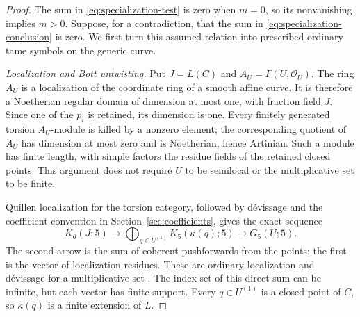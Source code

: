 \begin{proof}
The sum in \eqref{eq:specialization-test} is zero when $m=0$, so its
nonvanishing implies $m>0$.  Suppose, for a contradiction, that the sum in
\eqref{eq:specialization-conclusion} is zero.  We first turn this assumed
relation into prescribed ordinary tame symbols on the generic curve.

\smallskip\noindent\emph{Localization and Bott untwisting.}
Put $J=L(C)$ and $A_U=\Gamma(U,\mathcal O_U)$.  The ring $A_U$ is a
localization of the coordinate ring of a smooth affine curve.  It is
therefore a Noetherian regular domain of dimension at most one, with
fraction field $J$.  Since one of the $p_i$ is retained, its dimension is
one.  Every finitely generated torsion $A_U$-module is killed by a nonzero
element; the corresponding quotient of $A_U$ has dimension at most zero
and is Noetherian, hence Artinian.  Such a module has finite length, with simple
factors the residue fields of the retained closed points.  This argument
does not require $U$ to be semilocal or the multiplicative set to be finite.

Quillen localization for the torsion category, followed by d\'evissage and
the coefficient convention in Section~\ref{sec:coefficients}, gives the
exact sequence
\begin{equation}\label{eq:curve-localization}
 K_6(J;5)\longrightarrow
 \bigoplus_{q\in U^{(1)}}K_5(\kappa(q);5)
 \longrightarrow G_5(U;5).
\end{equation}
The second arrow is the sum of coherent pushforwards from the points; the
first is the vector of localization residues.  These are ordinary
localization and d\'evissage for a multiplicative set
\cite[\S4, Theorem~3 and Corollary~2; \S5, Theorems~4--5;
\S7, Proposition~3.2 and paragraph~3.4]{Quillen1973Higher}.
The index set of this direct sum can be infinite, but each vector has finite
support.  Every $q\in U^{(1)}$ is a closed point of
$C$, so $\kappa(q)$ is a finite extension of $L$.


\end{proof}
